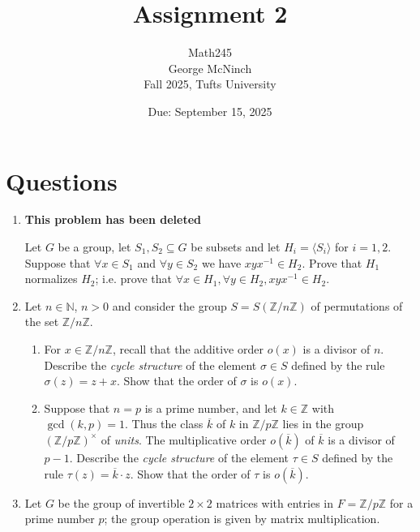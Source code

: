 \documentclass{article}
\title{Assignment 2}
\author{Math245 \\ George McNinch \\ Fall 2025, Tufts University}
\date{Due: September 15, 2025}
\begin{document}
\maketitle

\section*{Questions}

\begin{enumerate}
\item
  \textbf{This problem has been deleted}

  {\tiny Let $G$ be a group, let $S_1, S_2 \subseteq G$ be subsets and let
  $H_i = \langle S_i \rangle$ for $i=1,2$. Suppose that $\forall x \in
  S_1$ and $\forall y \in S_2$ we have $xyx^{-1} \in H_2$. Prove that
  $H_1$ normalizes $H_2$; i.e. prove that $\forall x \in H_1, \forall
  y \in H_2, xyx^{-1} \in H_2$.}

\item
Let $n \in \mathbb{N}$, $n > 0$ and consider the group $S = S(\mathbb{Z}/n\mathbb{Z})$ of permutations of the set $\mathbb{Z}/n\mathbb{Z}$.

\begin{enumerate}
    \item For $x \in \mathbb{Z}/n\mathbb{Z}$, recall that the additive order $o(x)$ is a divisor of $n$. Describe the \textit{cycle structure} of the element $\sigma \in S$ defined by the rule $\sigma(z) = z + x$. Show that the order of $\sigma$ is $o(x)$.
    \item Suppose that $n = p$ is a prime number, and let $k \in \mathbb{Z}$ with $\gcd(k,p) = 1$. Thus the class $\overline{k}$ of $k$ in $\mathbb{Z}/p\mathbb{Z}$ lies in the group $(\mathbb{Z}/p\mathbb{Z})^\times$ of \textit{units}. The multiplicative order $o(\overline{k})$ of $\overline{k}$ is a divisor of $p-1$. Describe the \textit{cycle structure} of the element $\tau \in S$ defined by the rule $\tau(z) = \overline{k} \cdot z$. Show that the order of $\tau$ is $o(\overline{k})$.
\end{enumerate}

\item
Let $G$ be the group of invertible $2 \times 2$ matrices with entries in $F = \mathbb{Z}/p\mathbb{Z}$ for a prime number $p$; the group operation is given by matrix multiplication.


\end{enumerate}
\end{document}
